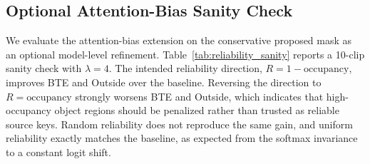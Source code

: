 \documentclass[nouppercase]{kaia}
\begin{document}
\subsection{Optional Attention-Bias Sanity Check}
We evaluate the attention-bias extension on the conservative proposed mask as an optional model-level refinement. Table~\ref{tab:reliability_sanity} reports a 10-clip sanity check with $\lambda=4$. The intended reliability direction, $R=1-\mathrm{occupancy}$, improves BTE and Outside over the baseline. Reversing the direction to $R=\mathrm{occupancy}$ strongly worsens BTE and Outside, which indicates that high-occupancy object regions should be penalized rather than trusted as reliable source keys. Random reliability does not reproduce the same gain, and uniform reliability exactly matches the baseline, as expected from the softmax invariance to a constant logit shift.

\begin{table}[h]
\begin{center}
\end{center}
\caption{Reliability-bias sanity check on 10 AI-Hub clips. The baseline denotes the corresponding preprocessing-only output on the 10-clip attention sanity subset. The useful direction is $R=1-\mathrm{occupancy}$; reversing the direction hurts BTE and Outside, random reliability is inconsistent, and uniform reliability reduces to the baseline.}
\label{tab:reliability_sanity}
\end{table}
\end{document}
